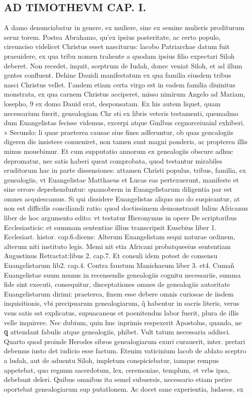 \documentclass{article}
\begin{document}
\begin{pages}
\section*{AD TIMOTHEVM CAP. I. }
\marginpar{[ p.14 ]}\pstart A damo denunciabatur in genere, ex muliere, sine ex semine mulieris proditurum seruz torem. Postea Abrahamo, qu’ex ipsius posteritate, ac certo populo, cireunciso videlicet Christus esset nasciturus: lacobo Patriarchae datum fuit praeuidere, ex qua tribu nomen trahente a quodam ipsius filio expectari Siloh deberet. Non recedet, inquit, sceptrum de Iudah, donec veniat Siloh, et ad illum gentes confluent. Dehinc Dauidi manifestatum ex qua familia eiusdem tribus nasci Christus vellet. I’andem etiam certa virgo est in eadem familia diuinitus monstrata, ex qua carnem Christus acciperet, misso nimirum Angelo ad Mariam, losepho, 9 ex domo Dauid erat, desponsatam. Ex his autem liquet, quam necessarium fuerit, genealogiam Chr sti ex libris veteris testamenti, quemadmo dum Euangelistas fecisse videmus, excerpi atque  Gmlbus cegnorceiuainl exhiberi.  \pend\pstart » Secundo: li quae praeterea causae siue fines adferuntur, ob quas gencalogiis digeren dis insistere conueniret, non tamen sunt magni ponderis, ac propterea illis minus mouebimur. Et cum supputatio annorum ex genealogiis obscure adhuc depromatur, nec satis haberi queat comprobata, quod testantur mirabiles eruditorum hac in parte dissensiones: attamen Christi populus, tribus, familia, ex genealogiis, vt Euangelistae Matthaeus et Lucas eas pertexuerunt, manifeste et sine errore deprehenduntur: quamobrem in Euangelistarum diligentia par est omnes acquiescamus. Si qui dissidere Euangelistas aliquo mo do suspicantur, at non est difficilis conciliandi ratio: quod doctissimem demonstrauit lulius Africanus liber  de hoc argumento edito: vt testatur Hieronymus in opere De scriptoribus Ecclesiasticis: et summam sententiae illius transcripsit Eusebius liber 1. Ecclesiast. histor. cap.6.dicens: Alterum Euangelistam sequi naturae ordinem, alterum niti instituto legis. Memi nit etia Africani probatqueeius sententiam Augustinus Retractat:libus 2. cap.7. Et consuli idem potest de consensu Euangelistarum lib2. cap.4. Contra faustum Manichaeum liber 3. et4. Cumañ Euangelistae suum munus in recensendis genealogiis cognitu necessariis, summa fide sint executi, consequitur, disceptationes omnes de genealogiis autoritate Euangelistarum dirimi: praeterea, finem esse debere omnis curiosae de iisdem inquisitionis, vbi precipuarum genealogiarum, q̃ habentur in sacris literis, verus vsus satis est explicatus, supuacaneus et poenitendus labor fuerit, plura de illis velle inquirere. Nec dubium, quin huc inprimis respexerit Apostolus, quando, ne ꝗ attendant fabulis atque  genealogiis, phibet. Vult tatum necessaria addisci. Quarto quod proinde Herodes sibros genealogiarum exuri curauerit, inter. pretari debemus iusto det iudicio esse factum. Etenim vaticinium lacob de ablato sceptro a ludah, aut de aduentu Siloh, impletum conspiciebatur, iamque  rempus appetebat, quo regnum sacerdotum, lex, ceremoniae, templum, et vrbs ipsa, debebant deleri. Quibus omnibus ita semel subuersis, necessario etiam perire oportebat genealogiarum sup putatlonem. Ac docet sane experientia, ludaeos, ex 
\end{pages}
\end{document}
